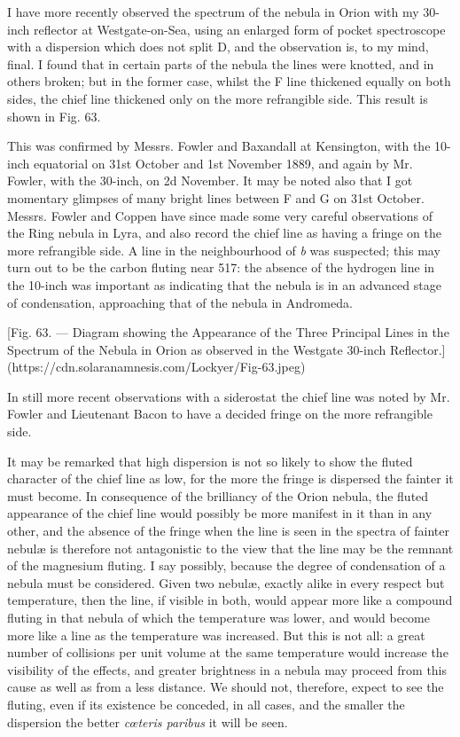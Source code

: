 \documentclass[a4paper, 12pt, oneside, polutonikogreek, english]{article}
\begin{document}
I have more recently observed the spectrum of the nebula in Orion with my 30-inch reflector at Westgate-on-Sea, using an enlarged form of pocket spectroscope with a dispersion which does not split D, and the observation is, to my mind, final. I found that in certain parts of the nebula the lines were knotted, and in others broken; but in the former case, whilst the F line thickened equally on both sides, the chief line thickened only on the more refrangible side. This result is shown in Fig. 63.

This was confirmed by Messrs. Fowler and Baxandall at Kensington, with the 10-inch equatorial on 31st October and 1st November 1889, and again by Mr. Fowler, with the 30-inch, on 2d November. It may be noted also that I got momentary glimpses of many bright lines between F and G on 31st October. Messrs. Fowler and Coppen have since made some very careful observations of the Ring nebula in Lyra, and also record the chief line as having a fringe on the more refrangible side. A line in the neighbourhood of \emph{b} was suspected; this may turn out to be the carbon fluting near 517: the absence of the hydrogen line in the 10-inch was important as indicating that the nebula is in an advanced stage of condensation, approaching that of the nebula in Andromeda.

[Fig. 63. --- Diagram showing the Appearance of the Three Principal Lines in the Spectrum of the Nebula in Orion as observed in the Westgate 30-inch Reflector.](https://cdn.solaranamnesis.com/Lockyer/Fig-63.jpeg)

In still more recent observations with a siderostat the chief line was noted by Mr. Fowler and Lieutenant Bacon to have a decided fringe on the more refrangible side.

It may be remarked that high dispersion is not so likely to show the fluted character of the chief line as low, for the more the fringe is dispersed the fainter it must become. In consequence of the brilliancy of the Orion nebula, the fluted appearance of the chief line would possibly be more manifest in it than in any other, and the absence of the fringe when the line is seen in the spectra of fainter nebulæ is therefore not antagonistic to the view that the line may be the remnant of the magnesium fluting. I say possibly, because the degree of condensation of a nebula must be considered. Given two nebulæ, exactly alike in every respect but temperature, then the line, if visible in both, would appear more like a compound fluting in that nebula of which the temperature was lower, and would become more like a line as the temperature was increased. But this is not all: a great number of collisions per unit volume at the same temperature would increase the visibility of the effects, and greater brightness in a nebula may proceed from this cause as well as from a less distance. We should not, therefore, expect to see the fluting, even if its existence be conceded, in all cases, and the smaller the dispersion the better \emph{cœteris paribus} it will be seen.
\end{document}
